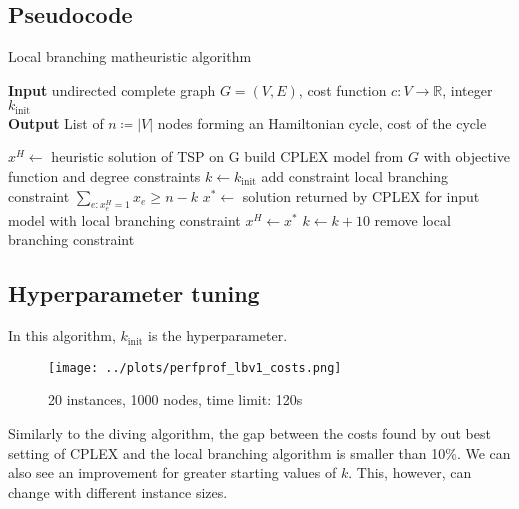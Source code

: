 \subsection{Pseudocode}
\begin{algorithm}[h]
    \caption{Local branching matheuristic algorithm}
    \hspace*{\algorithmicindent} \textbf{Input} undirected complete graph $G=(V,E)$, cost function $c:V\rightarrow\mathbb{R}$, integer $k_{\text{init}}$\\
    \hspace*{\algorithmicindent} \textbf{Output} List of $n\coloneq|V|$ nodes forming an Hamiltonian cycle, cost of the cycle\\
    \begin{algorithmic}

        \State $x^H \gets$ heuristic solution of TSP on G
        \State build CPLEX model from $G$ with objective function and degree constraints
        \State $k\gets k_{\text{init}}$
        \State add constraint local branching constraint $\sum_{e:x_e^H=1}x_e\geq n-k$
        \State $x^*\gets$ solution returned by CPLEX for input model with local branching constraint
        \State $x^H\gets x^*$
        \EndIf
        \State $k\gets k+10$
        \EndIf
        \State remove local branching constraint
        \EndWhile

    \end{algorithmic}
\end{algorithm}
\FloatBarrier

\subsection{Hyperparameter tuning}

In this algorithm, $k_{\text{init}}$ is the hyperparameter.

\begin{figure}[h]
    \centering
    \texttt{[image: ../plots/perfprof\_lbv1\_costs.png]}
    \caption*{20 instances, 1000 nodes, time limit: 120s}
\end{figure}

Similarly to the diving algorithm, the gap between the costs found by out best setting of CPLEX and the local branching algorithm is smaller than 10\%. We can also see an improvement for greater starting values of $k$. This, however, can change with different instance sizes.